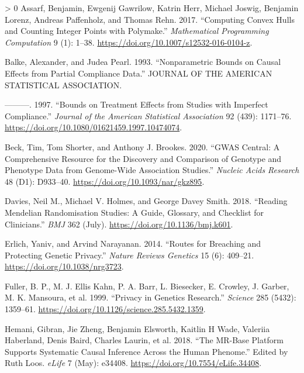 \documentclass[
]{article}
\theoremstyle{plain}
\newlength{\cslhangindent}
\newenvironment{CSLReferences}[3] %
 {%
  \setlength{\parindent}{0pt}
  \ifodd #1 \everypar{\setlength{\hangindent}{\cslhangindent}}\ignorespaces\fi
  \ifnum #2 > 0
  \setlength{\parskip}{#2\baselineskip}
  \fi
 }%
 {}
\begin{document}
\hypertarget{refs}{}
\begin{CSLReferences}{1}{0}
\leavevmode\hypertarget{ref-assarf_computing_2017}{}%
Assarf, Benjamin, Ewgenij Gawrilow, Katrin Herr, Michael Joswig, Benjamin Lorenz, Andreas Paffenholz, and Thomas Rehn. 2017. {``Computing Convex Hulls and Counting Integer Points with Polymake.''} \emph{Mathematical Programming Computation} 9 (1): 1--38. \url{https://doi.org/10.1007/s12532-016-0104-z}.

\leavevmode\hypertarget{ref-balke_nonparametric_1993}{}%
Balke, Alexander, and Judea Pearl. 1993. {``Nonparametric {Bounds} on {Causal Effects} from {Partial Compliance Data}.''} {JOURNAL OF THE AMERICAN STATISTICAL ASSOCIATION}.

\leavevmode\hypertarget{ref-balke_bounds_1997}{}%
---------. 1997. {``Bounds on {Treatment Effects} from {Studies} with {Imperfect Compliance}.''} \emph{Journal of the American Statistical Association} 92 (439): 1171--76. \url{https://doi.org/10.1080/01621459.1997.10474074}.

\leavevmode\hypertarget{ref-beck_gwas_2020}{}%
Beck, Tim, Tom Shorter, and Anthony J. Brookes. 2020. {``{GWAS Central}: A Comprehensive Resource for the Discovery and Comparison of Genotype and Phenotype Data from Genome-Wide Association Studies.''} \emph{Nucleic Acids Research} 48 (D1): D933--40. \url{https://doi.org/10.1093/nar/gkz895}.

\leavevmode\hypertarget{ref-davies_reading_2018}{}%
Davies, Neil M., Michael V. Holmes, and George Davey Smith. 2018. {``Reading {Mendelian} Randomisation Studies: A Guide, Glossary, and Checklist for Clinicians.''} \emph{BMJ} 362 (July). \url{https://doi.org/10.1136/bmj.k601}.

\leavevmode\hypertarget{ref-erlich_routes_2014}{}%
Erlich, Yaniv, and Arvind Narayanan. 2014. {``Routes for Breaching and Protecting Genetic Privacy.''} \emph{Nature Reviews Genetics} 15 (6): 409--21. \url{https://doi.org/10.1038/nrg3723}.

\leavevmode\hypertarget{ref-fuller_privacy_1999}{}%
Fuller, B. P., M. J. Ellis Kahn, P. A. Barr, L. Biesecker, E. Crowley, J. Garber, M. K. Mansoura, et al. 1999. {``Privacy in {Genetics Research}.''} \emph{Science} 285 (5432): 1359--61. \url{https://doi.org/10.1126/science.285.5432.1359}.

\leavevmode\hypertarget{ref-mrbase}{}%
Hemani, Gibran, Jie Zheng, Benjamin Elsworth, Kaitlin H Wade, Valeriia Haberland, Denis Baird, Charles Laurin, et al. 2018. {``The MR-Base Platform Supports Systematic Causal Inference Across the Human Phenome.''} Edited by Ruth Loos. \emph{eLife} 7 (May): e34408. \url{https://doi.org/10.7554/eLife.34408}.


\end{CSLReferences}
\end{document}
